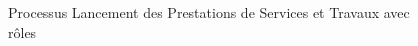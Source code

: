 \begin{figure}[H]
    \label{fig-lancement}
    \noindent{}
    \caption{Processus Lancement des Prestations de Services et Travaux avec rôles}
\end{figure}

